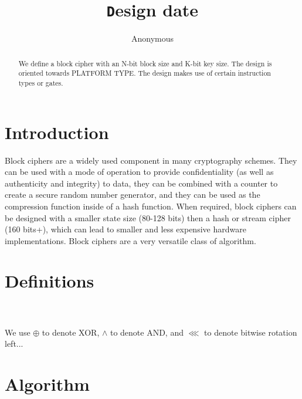 \documentclass[preprint]{iacrtrans}
\author{Anonymous\inst{1}}
\institute{City, State \email{address@provider.com}}
\title[\texttt Design date]{\texttt Design date}
\begin{document}
\maketitle


\begin{abstract}
  We define a block cipher with an N-bit block size and K-bit key size. The design is oriented towards PLATFORM TYPE. The design makes use of certain instruction types or gates. \\ 
\end{abstract}

\todototoc
\listoftodos

\section{Introduction}
 Block ciphers are a widely used component in many cryptography schemes. They can be used with a mode of operation to provide confidentiality (as well as authenticity and integrity) to data, they can be combined with a counter to create a secure random number generator, and they can be used as the compression function inside of a hash function. When required, block ciphers can be designed with a smaller state size (80-128 bits) then a hash or stream cipher (160 bits+), which can lead to smaller and less expensive hardware implementations. Block ciphers are a very versatile class of algorithm.



\section{Definitions}
\\
\\
We use $\oplus$ to denote XOR, $\land$ to denote AND, and $\lll$ to denote bitwise rotation left...

\section{Algorithm}
\\
\\
\end{document}
